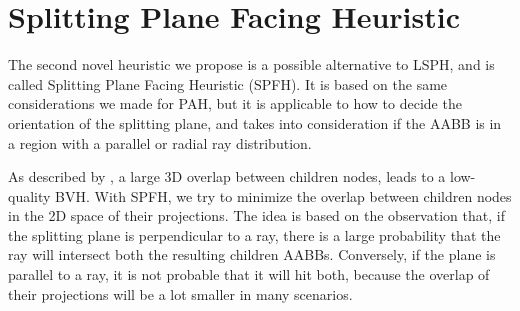 \documentclass[11pt,a4paper,twocolumn]{article}
\begin{document}
\section{Splitting Plane Facing Heuristic}
The second novel heuristic we propose is a possible alternative to LSPH, and is called Splitting Plane Facing Heuristic (SPFH). It is based on the same considerations we made for PAH, but it is applicable to how to decide the orientation of the splitting plane, and takes into consideration if the AABB is in a region with a parallel or radial ray distribution.

As described by \cite{bvh_overlapping_metric}, a large 3D overlap between children nodes, leads to a low-quality BVH. With SPFH, we try to minimize the overlap between children nodes in the 2D space of their projections. The idea is based on the observation that, if the splitting plane is perpendicular to a ray, there is a large probability that the ray will intersect both the resulting children AABBs. Conversely, if the plane is parallel to a ray, it is not probable that it will hit both, because the overlap of their projections will be a lot smaller in many scenarios.
\end{document}
